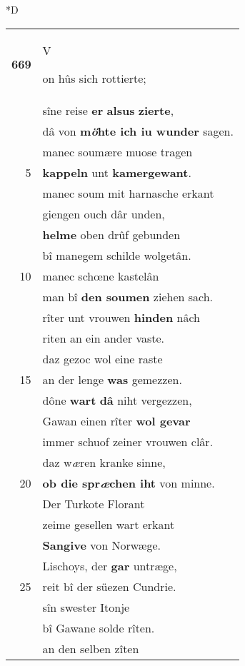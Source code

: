 \documentclass[8pt,a4paper,notitlepage]{article}
\begin{document}
\begin{table}[ht]
\begin{minipage}[t]{0.5\linewidth}
\small
\begin{center}*D
\end{center}
\begin{tabular}{rl}
\textbf{669} & \begin{large}V\end{large}on hûs sich rottierte;\\ 
 & sîne reise \textbf{er} \textbf{alsus} \textbf{zierte},\\ 
 & dâ von \textbf{m\textit{ö}hte ich iu wunder} sagen.\\ 
 & manec soumære muose tragen\\ 
5 & \textbf{kappeln} unt \textbf{kamergewant}.\\ 
 & manec soum mit harnasche erkant\\ 
 & giengen ouch dâr unden,\\ 
 & \textbf{helme} oben drûf gebunden\\ 
 & bî manegem schilde wolgetân.\\ 
10 & manec schœne kastelân\\ 
 & man bî \textbf{den soumen} ziehen sach.\\ 
 & rîter unt vrouwen \textbf{hinden} nâch\\ 
 & riten an ein ander vaste.\\ 
 & daz gezoc wol eine raste\\ 
15 & an der lenge \textbf{was} gemezzen.\\ 
 & dône \textbf{wart} \textbf{dâ} niht vergezzen,\\ 
 & Gawan einen rîter \textbf{wol gevar}\\ 
 & immer schuof zeiner vrouwen clâr.\\ 
 & daz w\textit{æ}ren kranke sinne,\\ 
20 & \textbf{ob die spr\textit{æ}chen iht} von minne.\\ 
 & Der Turkote Florant\\ 
 & zeime gesellen wart erkant\\ 
 & \textbf{Sangive} von Norwæge.\\ 
 & Lischoys, der \textbf{gar} untræge,\\ 
25 & reit bî der süezen Cundrie.\\ 
 & sîn swester Itonje\\ 
 & bî Gawane solde rîten.\\ 
 & an den selben zîten\\ 

\end{tabular}
\end{minipage}
\end{table}
\end{document}

